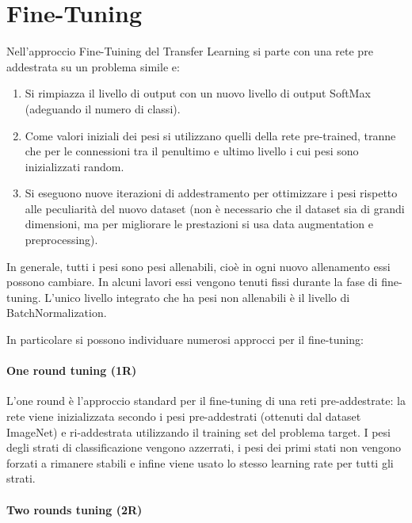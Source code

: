 \section{Fine-Tuning}\label{fine-tuning}

Nell'approccio Fine-Tuining del Transfer Learning si parte con una rete pre addestrata su un problema simile e:
\begin{enumerate}
    \item Si rimpiazza il livello di output con un nuovo livello di output SoftMax (adeguando il numero di classi).
    \item Come valori iniziali dei pesi si utilizzano quelli della rete pre-trained, tranne che per le connessioni tra il penultimo e ultimo livello i cui pesi sono inizializzati random.
    \item Si eseguono nuove iterazioni di addestramento per ottimizzare i pesi rispetto alle peculiarità del nuovo dataset (non è necessario che il dataset sia di grandi dimensioni, ma per migliorare le prestazioni si usa data augmentation e preprocessing).
\end{enumerate}

In generale, tutti i pesi sono pesi allenabili, cioè in  ogni nuovo allenamento essi possono cambiare. In alcuni lavori essi vengono tenuti fissi durante la fase di fine-tuning. L'unico livello integrato che ha pesi non allenabili è il livello di BatchNormalization\cite{team_keras_nodate}\cite{lumini_plankton}.

In particolare si possono individuare numerosi approcci per il fine-tuning:
\paragraph {One round tuning (1R)} \label{one-round-tuning}

L'one round è l'approccio standard per il fine-tuning di una reti pre-addestrate: la rete viene inizializzata secondo i pesi pre-addestrati (ottenuti dal dataset ImageNet) e ri-addestrata utilizzando il training set del problema target. I pesi degli strati di classificazione vengono azzerrati, i pesi dei primi stati non vengono forzati a rimanere stabili e infine viene usato lo stesso learning rate per tutti gli strati\cite{lumini_plankton}. 

\paragraph{Two rounds tuning (2R)} \label{two-round-tuning}

